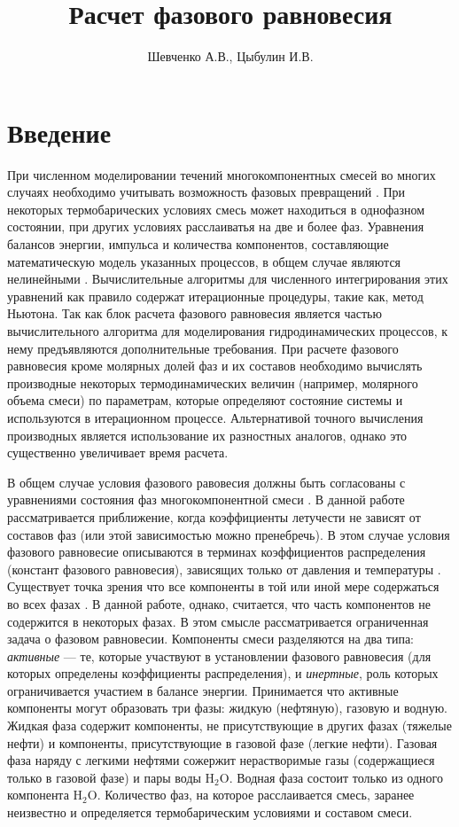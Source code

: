 \documentclass[12pt]{article}
\title{Расчет фазового равновесия}
\author{Шевченко А.В., Цыбулин И.В.}
\begin{document}
\maketitle

\section{Введение}

При численном моделировании течений многокомпонентных смесей во многих случаях необходимо учитывать возможность фазовых превращений \cite{Rozenberg}. При некоторых термобарических условиях смесь может находиться в однофазном состоянии, при других условиях расслаиватья на две и более фаз. Уравнения балансов энергии, импульса и количества компонентов, составляющие математическую модель указанных процессов, в общем случае являются нелинейными \cite{Chen}. Вычислительные алгоритмы для численного интегрирования этих уравнений как правило содержат итерационные процедуры, такие как, метод Ньютона. Так как блок расчета фазового равновесия является частью вычислительного алгоритма для моделирования гидродинамических процессов, к нему предъявляются дополнительные требования. При расчете фазового равновесия кроме молярных долей фаз и их составов необходимо вычислять производные некоторых термодинамических величин (например, молярного объема смеси) по параметрам, которые определяют состояние системы и используются в итерационном процессе. Альтернативой точного вычисления производных является использование их разностных аналогов, однако это существенно увеличивает время расчета.

В общем случае условия фазового равовесия должны быть согласованы с уравнениями состояния фаз многокомпонентной смеси \cite{Batalin, Firoozabadi}. В данной работе рассматривается приближение, когда коэффициенты летучести не зависят от составов фаз (или этой зависимостью можно пренебречь). В этом случае условия фазового равновесие описываются в терминах коэффициентов распределения (констант фазового равновесия), зависящих только от давления и температуры \cite{Orr}. Существует точка зрения что все компоненты в той или иной мере содержаться во всех фазах \cite{Prigozhin}. В данной работе, однако, считается, что часть компонентов не содержится в некоторых фазах. В этом смысле рассматривается ограниченная задача о фазовом равновесии. Компоненты смеси разделяются на два типа: \emph{активные} --- те, которые участвуют в установлении фазового равновесия (для которых определены коэффициенты распределения), и \emph{инертные}, роль которых ограничивается участием в балансе энергии. Принимается что активные компоненты могут образовать три фазы: жидкую (нефтяную), газовую и водную.  Жидкая фаза содержит компоненты, не присутствующие в других фазах (тяжелые нефти) и компоненты, присутствующие в газовой фазе (легкие нефти). Газовая фаза наряду с легкими нефтями сожержит нерастворимые газы (содержащиеся только в газовой фазе) и пары воды $\mathrm{H_2O}$. Водная фаза состоит только из одного компонента $\mathrm{H_2O}$. Количество фаз, на которое расслаивается смесь, заранее неизвестно и определяется термобарическим условиями и составом смеси.
\end{document}
